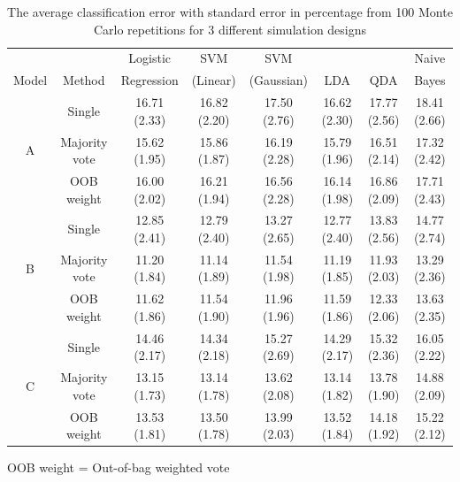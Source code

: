 \documentclass[eng]{csam}
\begin{document}
\begin{table}[ht]
	\footnotesize
	\caption{The average classification error with standard error in percentage from 100 Monte Carlo repetitions for 3 different simulation designs}
	\tabcolsep=6.5pt
	\begin{tabular}{cccccccc}
		\hline\hline
			  &        & Logistic   & SVM      & SVM        &     &     & Naive \\
		Model & Method & Regression & (Linear) & (Gaussian) & LDA & QDA & Bayes \\ 
		\hline
		\multirow{3}{*}{A} & Single        & 16.71 (2.33) & 16.82 (2.20) & 17.50 (2.76) & 16.62 (2.30) & 17.77 (2.56) & 18.41 (2.66) \\
					       & Majority vote & 15.62 (1.95) & 15.86 (1.87) & 16.19 (2.28) & 15.79 (1.96) & 16.51 (2.14) & 17.32 (2.42) \\ 
						   & OOB weight    & 16.00 (2.02) & 16.21 (1.94) & 16.56 (2.28) & 16.14 (1.98) & 16.86 (2.09) & 17.71 (2.43) \\ 
		\hline
		\multirow{3}{*}{B} & Single        & 12.85 (2.41) & 12.79 (2.40) & 13.27 (2.65) & 12.77 (2.40) & 13.83 (2.56) & 14.77 (2.74) \\ 
						   & Majority vote & 11.20 (1.84) & 11.14 (1.89) & 11.54 (1.98) & 11.19 (1.85) & 11.93 (2.03) & 13.29 (2.36) \\ 
						   & OOB weight    & 11.62 (1.86) & 11.54 (1.90) & 11.96 (1.96) & 11.59 (1.86) & 12.33 (2.06) & 13.63 (2.35) \\ 
		\hline
		\multirow{3}{*}{C} & Single        & 14.46 (2.17) & 14.34 (2.18) & 15.27 (2.69) & 14.29 (2.17) & 15.32 (2.36) & 16.05 (2.22) \\
						   & Majority vote & 13.15 (1.73) & 13.14 (1.78) & 13.62 (2.08) & 13.14 (1.82) & 13.78 (1.90) & 14.88 (2.09) \\ 
						   & OOB weight    & 13.53 (1.81) & 13.50 (1.78) & 13.99 (2.03) & 13.52 (1.84) & 14.18 (1.92) & 15.22 (2.12) \\ 
		\hline\hline
	\end{tabular}
	OOB weight = Out-of-bag weighted vote
\end{table}




\end{document}
